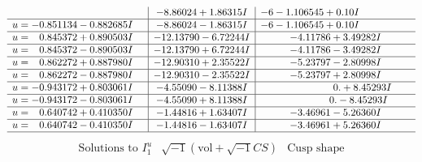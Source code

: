 \documentclass[1p]{elsarticle_modified}
\theoremstyle{definition}
\newcommand{\I}{\sqrt{-1}}
\begin{document}
$$\begin{array}{c|c|c}
 & -8.86024 + 1.86315 I &                  -6
-1.106545 + 0. 10   I\phantom{ +0.000000I} \\ \hline\begin{aligned}
u &= -0.851134 - 0.882685 I\end{aligned}
 & -8.86024 - 1.86315 I &                  -6
-1.106545 + 0. 10   I\phantom{ +0.000000I} \\ \hline\begin{aligned}
u &= \phantom{-}0.845372 + 0.890503 I\end{aligned}
 & -12.13790 - 6.72244 I & -4.11786 + 3.49282 I \\ \hline\begin{aligned}
u &= \phantom{-}0.845372 - 0.890503 I\end{aligned}
 & -12.13790 + 6.72244 I & -4.11786 - 3.49282 I \\ \hline\begin{aligned}
u &= \phantom{-}0.862272 + 0.887980 I\end{aligned}
 & -12.90310 + 2.35522 I & -5.23797 - 2.80998 I \\ \hline\begin{aligned}
u &= \phantom{-}0.862272 - 0.887980 I\end{aligned}
 & -12.90310 - 2.35522 I & -5.23797 + 2.80998 I \\ \hline\begin{aligned}
u &= -0.943172 + 0.803061 I\end{aligned}
 & -4.55090 - 8.11388 I & \phantom{-0.000000 -}0. + 8.45293 I \\ \hline\begin{aligned}
u &= -0.943172 - 0.803061 I\end{aligned}
 & -4.55090 + 8.11388 I & \phantom{-0.000000 } 0. - 8.45293 I \\ \hline\begin{aligned}
u &= \phantom{-}0.640742 + 0.410350 I\end{aligned}
 & -1.44816 + 1.63407 I & -3.46961 - 5.26360 I \\ \hline\begin{aligned}
u &= \phantom{-}0.640742 - 0.410350 I\end{aligned}
 & -1.44816 - 1.63407 I & -3.46961 + 5.26360 I\\
 \hline 
 \end{array}$$\newpage$$\begin{array}{c|c|c}  
\text{Solutions to }I^u_{1}& \I (\text{vol} + \sqrt{-1}CS) & \text{Cusp shape}\\

\end{array}$$
\end{document}
